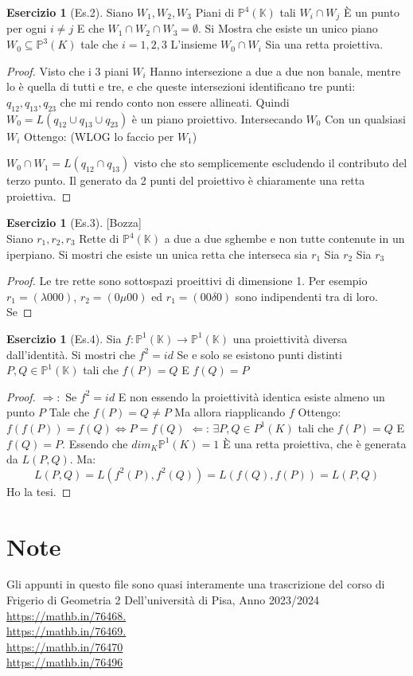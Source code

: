 \documentclass[a4paper,twoside]{article}
\newcommand{\Pro}{\mathbb{P}}
\newcommand{\K}{\mathbb{K}}
\theoremstyle{definition}
\newtheorem{ex}[theorem]{Esercizio}
\numberwithin{theorem}{section}
\begin{document}
\begin{ex}[Es.2]
Siano $W_1,W_2,W_3$ Piani di $\Pro^4(\K)$ tali $W_i\cap W_j$ È un punto per ogni $i\neq j$ E che $W_1\cap W_2\cap W_3 =\emptyset$. 
Si Mostra che esiste un unico piano $W_0\subseteq \Pro^3(K)$ tale che $i=1,2,3$ L’insieme $W_0\cap W_i$ Sia una retta proiettiva.
\end{ex}
\begin{proof}
    

Visto che i 3 piani $W_i$ Hanno intersezione a due a due non banale, mentre lo è quella di tutti e tre, e che queste intersezioni identificano tre punti: $q_{12},q_{13},q_{23}$ che mi rendo conto non essere allineati.
Quindi $W_0=L(q_{12}\cup q_{13}\cup q_{23})$ è un piano proiettivo. Intersecando $W_0$ Con un qualsiasi $W_i$ Ottengo: (WLOG lo faccio per $W_1$)

$W_0\cap W_1= L(q_{12}\cap q_{13})$ visto che sto semplicemente escludendo il contributo del terzo punto.
Il generato da 2 punti del proiettivo è chiaramente una retta proiettiva.

\end{proof}
\begin{ex}[Es.3]
[Bozza]\\
Siano $r_1,r_2,r_3$ Rette di $\Pro^4(\K)$ a due a due sghembe e non tutte contenute in un iperpiano. Si mostri che esiste un unica retta che interseca sia $r_1$ Sia $r_2$ Sia $r_3$
\end{ex}
\begin{proof}
    
Le tre rette sono sottospazi proeittivi di dimensione 1. Per esempio $r_1=(\lambda 0 0 0)$, $r_2=(0 \mu 0 0)$ ed $r_1=(0 0 \delta 0)$ sono indipendenti tra di loro. Se

\end{proof}
\begin{ex}[Es.4]
Sia $f:\Pro^1(\K)\to \Pro^1(\K)$ una proiettività diversa dall’identità. Si mostri che $f^2=id$ Se e solo se esistono punti distinti $P,Q\in \Pro^1(\K)$ tali che $f(P)=Q$ E $f(Q)=P$
\end{ex}
\begin{proof}
$\Rightarrow:$ Se $f^2=id$ E non essendo la proiettività identica esiste almeno un punto $P$ Tale che $f(P)=Q\neq P$ Ma allora riapplicando $f$ Ottengo:
 $f(f(P))=f(Q)\Leftrightarrow P=f(Q)$
$\Leftarrow$: $\exists P,Q\in P^1(K)$ tali che $f(P)=Q$ E $f(Q)=P$.
Essendo che $dim_K\mathbb{P}^1(K)=1$ È una retta proiettiva, che è generata da $L(P,Q)$. Ma:
$$L(P,Q)= L(f^2(P),f^2(Q))=L(f(Q),f(P))=L(P,Q) $$
Ho la tesi.
\end{proof}
\newpage
\section{Note}
Gli appunti in questo file sono quasi interamente una trascrizione del corso di Frigerio di Geometria 2 Dell'università di Pisa, Anno 2023/2024\\

\url{https://mathb.in/76468.} \\
\url{https://mathb.in/76469.} \\
\url{https://mathb.in/76470 }\\
\url{https://mathb.in/76496} \\
\end{document}
